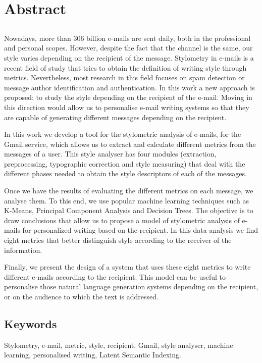 \chapter*{Abstract}

\section*{\tituloPortadaEngVal}

Nowadays, more than 306 billion e-mails are sent daily, both in the professional and personal scopes. However, despite the fact that the channel is the same, our style varies depending on the recipient of the message. Stylometry in e-mails is a recent field of study that tries to obtain the definition of writing style through metrics. Nevertheless, most research in this field focuses on spam detection or message author identification and authentication. In this work a new approach is proposed: to study the style depending on the recipient of the e-mail. Moving in this direction would allow us to personalise e-mail writing systems so that they are capable of generating different messages depending on the recipient.

In this work we develop a tool for the stylometric analysis of e-mails, for the Gmail service, which allows us to extract and calculate different metrics from the messages of a user. This style analyser has four modules (extraction, preprocessing, typographic correction and style measuring) that deal with the different phases needed to obtain the style descriptors of each of the messages.

Once we have the results of evaluating the different metrics on each message, we analyse them. To this end, we use popular machine learning techniques such as K-Means, Principal Component Analysis and Decision Trees. The objective is to draw conclusions that allow us to propose a model of stylometric analysis of e-mails for personalized writing based on the recipient. In this data analysis we find eight metrics that better distinguish style according to the receiver of the information.

Finally, we present the design of a system that uses these eight metrics to write different e-mails according to the recipient. This model can be useful to personalise those natural language generation systems depending on the recipient, or on the audience to which the text is addressed.

\section*{Keywords}

\noindent Stylometry, e-mail, metric, style, recipient, Gmail, style analyser, machine learning, personalised writing, Latent Semantic Indexing.



